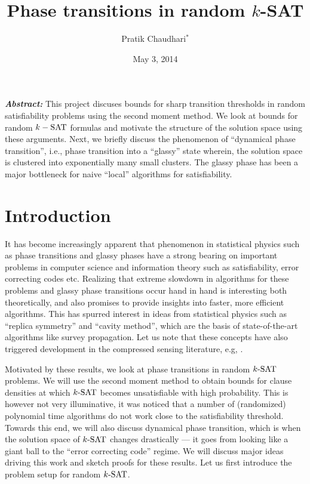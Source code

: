 \documentclass[letterpaper, 10pt, twocolumn, reqno]{amsart}
\title{Phase transitions in random $k$-SAT}
\author{Pratik Chaudhari$^*$}
\date{May 3, 2014}
\begin{document}
\maketitle
{\small
\textbf{\emph{Abstract:}}
This project discuses bounds for sharp transition thresholds in random satisfiability problems using the second moment method. We look at bounds for random $k-\textrm{SAT}$ formulas and motivate the structure of the solution space using these arguments. Next, we briefly discuss the phenomenon of ``dynamical phase transition'', i.e., phase transition into a ``glassy'' state wherein, the solution space is clustered into exponentially many small clusters. The glassy phase has been a major bottleneck for naive ``local'' algorithms for satisfiability.
}

\section{Introduction}
\label{sec:intro}
It has become increasingly apparent that phenomenon in statistical physics such as phase transitions and glassy phases have a strong bearing on important problems in computer science and information theory such as satisfiability, error correcting codes etc. Realizing that extreme slowdown in algorithms for these problems and glassy phase transitions occur hand in hand is interesting both theoretically, and also promises to provide insights into faster, more efficient algorithms. This has spurred interest in ideas from statistical physics such as ``replica symmetry'' and ``cavity method'', which are the basis of state-of-the-art algorithms like survey propagation. Let us note that these concepts have also triggered development in the compressed sensing literature, e.g, \cite{krzakala2012statistical}.



Motivated by these results, we look at phase transitions in random $k\textrm{-SAT}$ problems. We will use the second moment method to obtain bounds for clause
densities at which $k\textrm{-SAT}$ becomes unsatisfiable with high probability. This is however not very illuminative, it was noticed that a number of (randomized)
polynomial time algorithms do not work close to the satisfiability threshold. Towards this end, we will also discuss dynamical phase transition, which is
when the solution space of $k\textrm{-SAT}$ changes drastically --- it goes from looking like a giant ball to the ``error correcting code'' regime. We will discuss major ideas driving this work and sketch proofs for these results. Let us first introduce the problem setup for random $k\textrm{-SAT}$.
\end{document}

